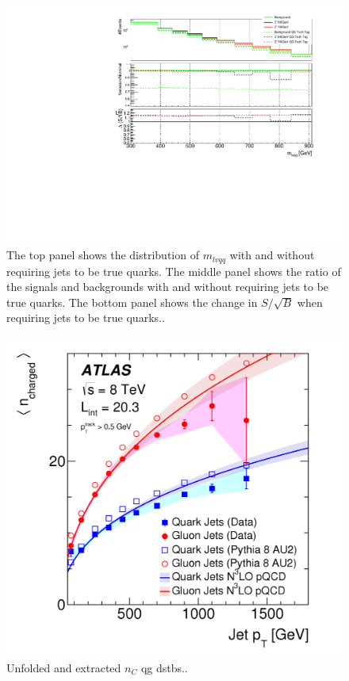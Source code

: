 {\begin{figure}[h!]
  \centering
  \includegraphics[width=\hsize]{figures/QGT/s_root_b_truthtag.pdf}
  \caption{The top panel shows the distribution of $m_{lvqq}$ with and without requiring jets to be true quarks. The middle panel shows the ratio of the signals and backgrounds with and without requiring jets to be true quarks. The bottom panel shows the change in $S/\sqrt{B}$ when requiring jets to be true quarks..}
  \label{fig:quark_gluon_roc_truth}
\end{figure}
\FloatBarrier



\begin{figure}[h!]
  \centering
  \includegraphics[width=\hsize]{figures/QGT/extracted_qg.png}
  \caption{Unfolded and extracted $n_{C}$ qg dstbs..}
  \label{fig:extracted_qg}
\end{figure}
\FloatBarrier



}
